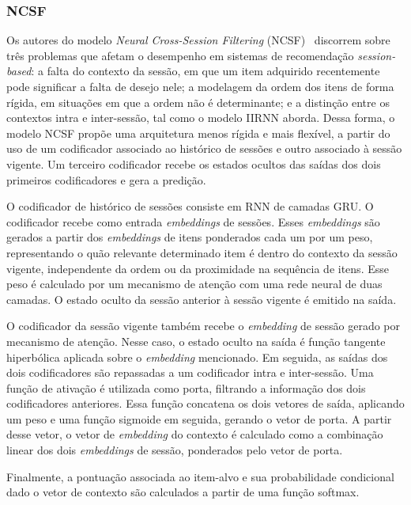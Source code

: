 \subsubsection{NCSF}
 Os autores do modelo
\textit{Neural Cross-Session Filtering} (NCSF)~\cite{hu2018neural} discorrem
sobre três problemas que afetam o desempenho em sistemas de recomendação
\textit{session-based}: a falta do contexto da sessão, em que um item adquirido
recentemente pode significar a falta de desejo nele; a modelagem da ordem dos
itens de forma rígida, em situações em que a ordem não é determinante; e a
distinção entre os contextos intra e inter-sessão, tal como o modelo IIRNN
aborda. Dessa forma, o modelo NCSF propõe uma arquitetura menos rígida e mais
flexível, a partir do uso de um codificador associado ao histórico de sessões e
outro associado à sessão vigente. Um terceiro codificador recebe os estados
ocultos das saídas dos dois primeiros codificadores e gera a predição.

O codificador de histórico de sessões consiste em RNN de camadas GRU. O
codificador recebe como entrada \textit{embeddings} de sessões. Esses
\textit{embeddings} são gerados a partir dos \textit{embeddings} de itens
ponderados cada um por um peso, representando o quão relevante determinado item
é dentro do contexto da sessão vigente, independente da ordem ou da proximidade
na sequência de itens. Esse peso é calculado por um mecanismo de atenção com uma
rede neural de duas camadas. O estado oculto da sessão anterior à sessão vigente
é emitido na saída.

O codificador da sessão vigente também recebe o \textit{embedding} de sessão
gerado por mecanismo de atenção. Nesse caso, o estado oculto na saída é função
tangente hiperbólica aplicada sobre o \textit{embedding} mencionado. Em seguida,
as saídas dos dois codificadores são repassadas a um codificador intra e
inter-sessão. Uma função de ativação é utilizada como porta, filtrando a
informação dos dois codificadores anteriores. Essa função concatena os dois
vetores de saída, aplicando um peso e uma função sigmoide em seguida, gerando o
vetor de porta. A partir desse vetor, o vetor de \textit{embedding} do contexto
é calculado como a combinação linear dos dois \textit{embeddings} de sessão,
ponderados pelo vetor de porta.

Finalmente, a pontuação associada ao item-alvo e sua probabilidade condicional
dado o vetor de contexto são calculados a partir de uma função softmax.
  
